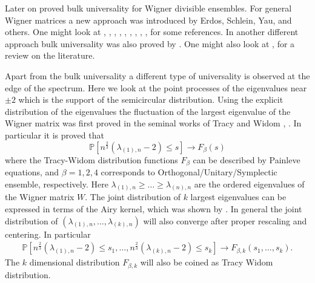 \documentclass[12pt]{article}
\numberwithin{equation}{section}
\numberwithin{equation}{section}
\theoremstyle{definition}
\renewcommand{\1}{\bf 1}
\begin{document}
Later on \citet{johansson} proved bulk universality for Wigner divisible ensembles. For general Wigner matrices a new approach was introduced by Erdos, Schlein, Yau, and others. One might look at \cite{erdHos2009semicircle}, \cite{erdHos2009local}, \cite{erdHos2012spectral}, \cite{erdHos2013spectral}, \cite{erdHos2010wegner}, \cite{erdHos2011universality}, \cite{erdHos2012local}, \cite{erdHos2012bulk}, \cite{erdos2010universality}, \cite{erdHos2012rigidity} for some references.  In another different approach bulk universality was also proved by \citet{tao2009random}.  One might also look at \citet{erdHos2012universality}, \citet{erdHos2012comment} for a review on the literature.

Apart from the bulk universality a different type of universality is observed at the edge of the spectrum. Here we look at the point processes of the eigenvalues near $\pm 2$ which is the support of the semicircular distribution. Using the explicit distribution of the eigenvalues the fluctuation of the largest eigenvalue of the Wigner matrix was first proved in the seminal works of Tracy and Widom \cite{tracy1994level}, \cite{tracy1996orthogonal}. In particular it is proved that 
\begin{equation}
\mathbb{P}\left[n^{\frac{2}{3}} \left( \lambda_{(1),n}- 2 \right)\le s\right] \to F_{\beta}(s)
\end{equation}
where the Tracy-Widom distribution functions $F_{\beta}$ can be described by Painleve equations, and $\beta= 1,2,4$ corresponds to Orthogonal/Unitary/Symplectic ensemble, respectively. Here $\lambda_{(1),n}\ge \ldots \ge \lambda_{(n),n}$ are the ordered eigenvalues of the Wigner matrix $W$. The joint distribution
of $k$ largest eigenvalues can be expressed in terms of the Airy kernel, which was shown by \citet{forrester1993spectrum}. In general the joint distribution of $\left( \lambda_{(1),n},\ldots , \lambda_{(k),n} \right)$ will also converge after proper rescaling and centering. In particular 
\begin{equation}
\begin{split}
\mathbb{P}\left[ n^{\frac{2}{3}}\left( \lambda_{(1),n}-2 \right)\le s_{1},\ldots, n^{\frac{2}{
3}}\left( \lambda_{(k),n} -2\right)\le s_{k} \right] \to F_{\beta,k}(s_{1},\ldots , s_{k}). 
\end{split}
\end{equation}
The $k$ dimensional distribution $F_{\beta,k}$ will also be coined as Tracy Widom distribution.
\end{document}
